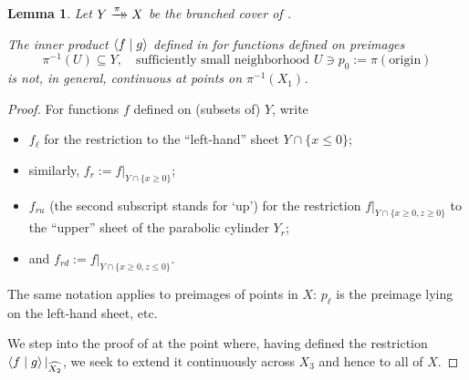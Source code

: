 \documentclass[11pt,leqno]{article}
\theoremstyle{plain}
\newtheorem{lemma}{Lemma}[section]
\theoremstyle{plain}
\theoremstyle{plain}
\numberwithin{equation}{section}
\theoremstyle{nonumberplain}
\newtheorem{proof}{Proof}
\newcommand\1{{\bf 1}}
\newcommand{\xrightarrowdbl}[2][]{%
  \xrightarrow[#1]{#2}\mathrel{\mkern-14mu}\rightarrow
}
\begin{document}
\begin{lemma}\label{le:23.sheets}
  Let $Y\xrightarrowdbl{\pi}X$ be the branched cover of .

  The inner product $\braket{f\mid g}$ defined in \cite[proof of Theorem 4.3]{pt_brnch} for functions defined on preimages
  \begin{equation*}
    \pi^{-1}(U)\subseteq Y
    ,\quad
    \text{sufficiently small neighborhood }
    U\ni p_0:=\pi(\text{origin})
  \end{equation*}
  is not, in general, continuous at points on $\pi^{-1}(X_1)$. 
\end{lemma}
\begin{proof}
  For functions $f$ defined on (subsets of) $Y$, write
  \begin{itemize}[wide]
  \item $f_{\ell}$ for the restriction to the ``left-hand'' sheet $Y\cap \{x\le 0\}$;

  \item similarly, $f_r:=f|_{Y\cap \{x\ge 0\}}$;

  \item $f_{ru}$ (the second subscript stands for `up') for the restriction $f|_{Y\cap\{x\ge 0,z\ge 0\}}$ to the ``upper'' sheet of the parabolic cylinder $Y_r$;

  \item and $f_{rd}:=f|_{Y\cap\{x\ge 0,z\le 0\}}$. 
  \end{itemize}
  The same notation applies to preimages of points in $X$: $p_{\ell}$ is the preimage lying on the left-hand sheet, etc.
  
  We step into the proof of \cite[Theorem 4.3]{pt_brnch} at the point where, having defined the restriction $\braket{f\mid g}|_{\widehat{X_2}}$, we seek to extend it continuously across $X_3$ and hence to all of $X$.


\end{proof}
\end{document}
